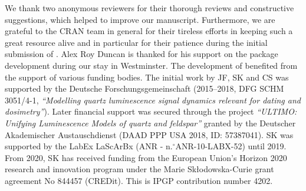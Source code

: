 We thank two anonymous reviewers for their thorough reviews and
constructive suggestions, which helped to improve our manuscript.
Furthermore, we are grateful to the CRAN team in general for their
tireless efforts in keeping such a great resource alive and in
particular for their patience during the initial submission of
. Alex Roy Duncan is thanked for his support on the
package development during our stay in Westminster. The development of
 benefited from the support of various funding
bodies. The initial work by JF, SK and CS was supported by the Deutsche
Forschungsgemeinschaft (2015--2018, DFG SCHM 3051/4-1, \emph{``Modelling
quartz luminescence signal dynamics relevant for dating and
dosimetry''}). Later financial support was secured through the project
\emph{``ULTIMO: Unifying Luminescence Models of quartz and feldspar''}
granted by the Deutscher Akademischer Austauschdienst (DAAD PPP USA
2018, ID: 57387041). SK was supported by the LabEx LaScArBx (ANR -
n.\(^{\circ}\)ANR-10-LABX-52) until 2019. From 2020, SK has received
funding from the European Union's Horizon 2020 research and innovation
program under the Marie Skłodowska-Curie grant agreement No 844457
(CREDit). This is IPGP contribution number 4202.




\address{%
Sebastian Kreutzer\\
Department of Geography \& Earth Sciences, Aberystwyth University\\%
Aberystwyth\\ SY23 3DB, Wales, United Kingdom\\
IRAMAT-CRP2A, UMR 5060, CNRS-Université Bordeaux Montaigne\\%
Maison de l'Archéologie\\ Esplanade des Antilles\\ 36607 Pessac Cedex,
France\\
%
%
\\\textit{ORCiD: \href{https://orcid.org/0000-0001-9166-4563}{0000-0001-9166-4563}}%
\\\href{mailto:sebastian.kreutzer@aber.ac.uk}{\nolinkurl{sebastian.kreutzer@aber.ac.uk}}
}

\address{%
Johannes Friedrich\\
Chair of Geomorphology, University of Bayreuth\\%
Universitätsstr. 30\\ 95447 Bayreuth, Germany\\
%
%
\\\textit{ORCiD: \href{https://orcid.org/0000-0002-0805-9547}{0000-0002-0805-9547}}%
\\\href{mailto:johannes.friedrich@posteo.de}{\nolinkurl{johannes.friedrich@posteo.de}}
}

